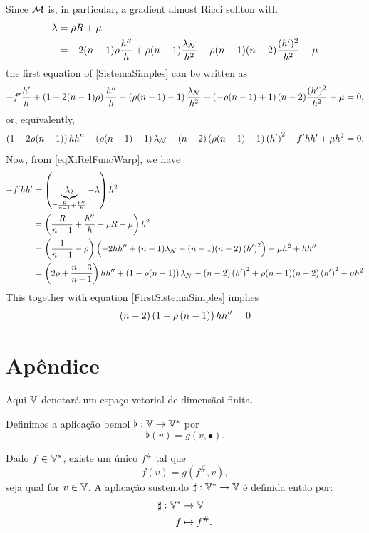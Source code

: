 \begin{demm}
	Since $\mathcal{M}$ is, in particular, a gradient almost Ricci soliton with
	\begin{align*}
		\lambda &= \rho R + \mu \\
		&= -2(n-1)\rho \frac{h''}{h} + \rho (n-1) \frac{\lambda_{\mathcal{N}}}{h^2} - \rho (n-1)(n-2) \frac{(h')^2}{h^2} + \mu
	\end{align*}
	the first equation of \cref{SistemaSimples} can be written as 
	\[
	-f' \frac{h'}{h} + \left(1 - 2 (n-1) \rho\right)  \frac{h''}{h} + \left(\rho(n-1) - 1\right) \frac{\lambda_{\mathcal{N}}}{h^2} + \left(-\rho(n-1) + 1\right) (n-2) \frac{(h')^2}{h^2} + \mu = 0,
	\]
	or, equivalently,
	\begin{equation}\label{FirstSistemaSimples}
	\left(1-2\rho(n-1)\right) h h'' + \left(\rho(n-1) - 1\right) \lambda_{\mathcal{N}} - (n-2)\left(\rho(n-1) -1\right) \left(h'\right)^2 - f' h h' + \mu h^2 = 0.
	\end{equation}
	Now, from \cref{eqXiRelFuncWarp}, we have
	\begin{align*}
		- f' h h' &= \left(\underbrace{\lambda_2}_{=\frac{R}{n-1} + \frac{h''}{h}} - \lambda\right) h^2 \\
		&= \left(\frac{R}{n-1} + \frac{h''}{h} - \rho R - \mu\right) h^2 \\
		&= \left(\frac{1}{n-1} - \rho\right) \left(-2 h h'' + (n-1) \lambda_{\mathcal{N}} - (n-1)(n-2) \left(h'\right)^2\right) - \mu h^2 + h h'' \\
		&= \left(2\rho + \frac{n-3}{n-1}\right) h h''+ \left(1 - \rho(n-1)\right) \lambda_{\mathcal{N}} - (n-2) \left(h'\right)^2 + \rho (n-1) (n-2) \left(h'\right)^2 - \mu h^2
	\end{align*}
	This together with equation \cref{FirstSistemaSimples} implies 
    \[
    \left(n-2\right)\left(1 - \rho \left(n-1\right)\right) h h'' = 0
    \]
	\end{demm}







      \section{Apêndice}

\begin{oobs}
Aqui $\mathbb{V}$ denotará um espaço vetorial de dimensãoi finita.
\end{oobs}

\begin{deff}\label{DefinicaoDoBemol}
  Definimos a aplicação bemol $\flat: \mathbb{V} \to \mathbb{V}^{\ast}$ por $$\flat(v) = g(v, \bullet).$$
  \end{deff} 
\begin{deff}
  Dado $f \in \mathbb{V}^{\ast}$, existe um único $f^{\#}$ tal que $$f(v) = g\left(f^{\#}, v\right),$$ seja qual for $v \in \mathbb{V}$. A aplicação sustenido $\sharp: \mathbb{V}^{\ast} \to \mathbb{V}$ é definida então por:
  \begin{align*}
  \sharp: \mathbb{V}^{\ast} &\to \mathbb{V} \\
  f &\mapsto f^{\#}.
  \end{align*}
  \end{deff}
  
